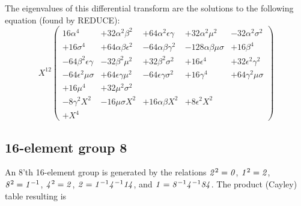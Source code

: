 \documentclass[12pt]{article}
\begin{document}
 The eigenvalues of this differential transform are the solutions to
the following equation (found by REDUCE):
\begin{displaymath}
X^{12} \left(
\begin{array}{ccccc}
16\alpha^4 & +32\alpha^2\beta^2 & +64\alpha^2\epsilon\gamma &
+32\alpha^2\mu^2 & -32\alpha^2\sigma^2 \\
+16\sigma^4 & +64\alpha\beta\epsilon^2 & -64\alpha\beta\gamma^2 &
-128\alpha\beta\mu\sigma & +16\beta^4 \\
-64\beta^2\epsilon\gamma & -32\beta^2\mu^2 & +32\beta^2\sigma^2 &
+16\epsilon^4 & +32\epsilon^2\gamma^2 \\
-64\epsilon^2\mu\sigma & +64\epsilon\gamma\mu^2 & -64\epsilon\gamma\sigma^2 &
+16\gamma^4 & +64\gamma^2\mu\sigma \\
+16\mu^4 & +32\mu^2\sigma^2 & & & \\
-8\gamma^2 X^2 & -16\mu\sigma X^2 & +16\alpha\beta X^2 & +8\epsilon^2 X^2 & \\
+X^4 & & & &
\end{array}
\right)
\end{displaymath}
\subsection{16-element group 8}
An 8'th 16-element group is generated by the relations
${{\bf \it 2}}^2 ={{\bf \it 0}}$, ${{\bf \it 1}}^2 = {{\bf \it 2}}$, ${{\bf \it 8}}^2={{\bf \it 1}}^{-1}$, ${{\bf \it 4}}^2= {{\bf \it 2}}$,
${{\bf \it 2}} = {{\bf \it 1}}^{-1}{{\bf \it 4}}^{-1}{{\bf \it 1}}{{\bf \it 4}}$, and
${{\bf \it 1}}={{\bf \it 8}}^{-1}{{\bf \it 4}}^{-1}{{\bf \it 8}}{{\bf \it 4}}$.  The product (Cayley) table resulting is
\end{document}
